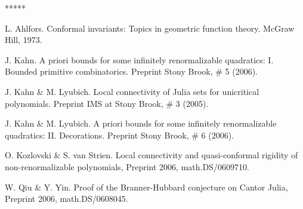 

\begin{thebibliography}{*****}

 L. Ahlfors. Conformal invariants: Topics in geometric function theory. McGraw Hill, 1973.

 J. Kahn. A priori bounds for some infinitely renormalizable quadratics: I.
                  Bounded primitive combinatorics. Preprint Stony Brook, \# 5 (2006).   

 J. Kahn \& M. Lyubich. 
  Local connectivity of Julia sets for unicritical polynomials. 
   Preprint IMS at Stony Brook, \# 3 (2005). 

 J. Kahn \& M. Lyubich. 
      A priori bounds for some infinitely renormalizable quadratics: II. Decorations. 
      Preprint Stony Brook, \# 6 (2006).


 O. Kozlovski \& S. van Strien. 
   Local connectivity and quasi-conformal rigidity of non-renormalizable polynomials, 
  Preprint 2006,  math.DS/0609710. 

 W. Qiu \& Y. Yin. 
   Proof of the Branner-Hubbard conjecture  on Cantor Julia, Preprint 2006, 
    math.DS/0608045.


\end{thebibliography}















